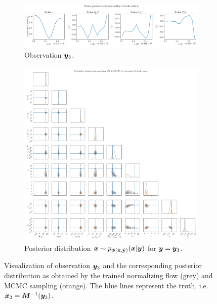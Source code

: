 \documentclass[a4paper,12pt]{report}
\begin{document}
\begin{figure}[h!]
	\centering
	\begin{subfigure}[t]{\textwidth}
	\centering
	\includegraphics[width=\textwidth]{figures/nf-milne-eddington-example-6-corner-spectrum-3-nf-nflows-piecewisequadratic.pdf}
    \caption{Observation $\bm{y}_3$.}
	\end{subfigure}
	\begin{subfigure}[t]{\textwidth}
	\centering
	\includegraphics[width=\textwidth]{figures/nf-milne-eddington-example-6-corner-3-nf-mcmc-nflows-piecewisequadratic.pdf}
    \caption{Posterior distribution $\bm{x}\sim p_{\bm{\phi}(\hat{\boldsymbol{\mathbf{x}}},\hat{\boldsymbol{\mathbf{y}}})}(\bm{x}|\bm{y})$ for $\bm{y} = \bm{y}_3$.}
	\end{subfigure}
\cprotect\caption{Visualization of observation $\bm{y}_3$ and the corresponding posterior distribution as obtained by the trained normalizing flow (grey) and MCMC sampling (orange). The blue lines represent the truth, i.e. $\bm{x}_3 = \bm{M}^{-1}(\bm{y}_3)$.}
\label{fig:nf-milne-eddington-example-6-corner-3-nf-piecewisequadratic-results}
\end{figure}
\end{document}
